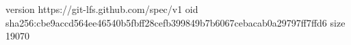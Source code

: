 version https://git-lfs.github.com/spec/v1
oid sha256:cbe9accd564ee46540b5fbff28cefb399849b7b6067cebacab0a29797ff7ffd6
size 19070
